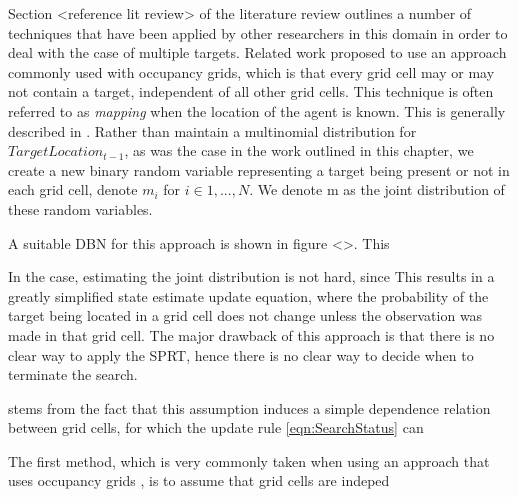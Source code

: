 Section <reference lit review> of the literature review outlines a number of techniques that have been applied by other researchers in this domain in order to deal with the case of multiple targets.  Related work \cite{Waharte2009CoordinatedUAVs} proposed to use an approach commonly used with occupancy grids, which is that every grid cell may or may not contain a target, independent of all other grid cells. This technique is often referred to as \textit{mapping} when the location of the agent is known. This is generally described in \cite[P.~284]{Thrun:2005:ProbabilisticRobotics}. Rather than maintain a multinomial distribution for $TargetLocation_{t-1}$, as was the case in the work outlined in this chapter, we create a new binary random variable representing a target being present or not in each grid cell, denote $m_i$ for $i \in {1,...,N}$. We denote m as the joint distribution of these random variables. 

A suitable DBN for this approach is shown in figure <>. This


In the case, estimating the joint distribution is not hard, since This results in a greatly simplified state estimate update equation, where the probability of the target being located in a grid cell does not change unless the observation was made in that grid cell. The major drawback of this approach is that there is no clear way to apply the SPRT, hence there is no clear way to decide when to terminate the search. 


stems from the fact that this assumption induces a simple dependence relation between grid cells, for which the update rule \ref{eqn:SearchStatus} can 


The first method, which is very commonly taken when using an approach that uses occupancy grids \cite{Elfes1989UsingNavigation}, is to assume that grid cells are indeped
